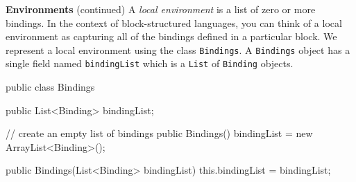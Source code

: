 \begin{minipage}[t]{\sw}
\slidenumber
\LARGE
{\bf Environments} (continued)\exx
A {\em local environment} is a list of zero or more bindings.
In the context of block-structured languages,
you can think of a local environment
as capturing all of the bindings defined in a particular block.
We represent a local environment using the class \verb'Bindings'.
A \verb'Bindings' object has a single field named \verb'bindingList'
which is a \verb'List' of \verb'Binding' objects.
\begin{qv}
public class Bindings {

    public List<Binding> bindingList;

    // create an empty list of bindings
    public Bindings() {
        bindingList = new ArrayList<Binding>();
    }

    public Bindings(List<Binding> bindingList) {
        this.bindingList = bindingList;
    }

}
\end{qv}
\end{minipage}

